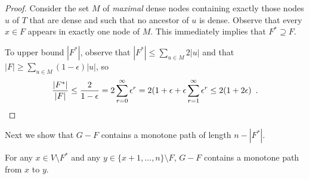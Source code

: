 \documentclass{patmorin}
\begin{document}
\begin{proof}
  Consider the set $M$ of \emph{maximal} dense nodes containing exactly
  those nodes $u$ of $T$ that are dense and such that no ancestor of $u$
  is dense.  Observe that every $x\in F$ appears in exactly one node
  of $M$.  This immediately implies that $F^*\supseteq F$.

  To upper bound $|F^*|$, observe that $|F^*| \le \sum_{u\in M} 2|u|$
  and that 
	$|F| \ge \sum_{u\in M} (1-\epsilon)|u|$, 
	so
  \[
    \frac{|F^*|}{|F|} 
      \le \frac{2}{1-\epsilon} 
	= 2\sum_{r=0}^\infty\epsilon^r 
	= 2(1+\epsilon + \epsilon\sum_{r=1}^\infty \epsilon^r 
	\le 2(1+2\epsilon) \enspace . \qedhere
	  \]
\end{proof}

Next we show that $G-F$ contains a monotone path of length $n-|F^*|$.

\begin{clm}
  For any $x\in V\setminus F^*$ and any $y\in \{x+1,\ldots,n\}\setminus
  F$, $G-F$ contains a monotone path from $x$ to $y$.
\end{clm}
\end{document}
